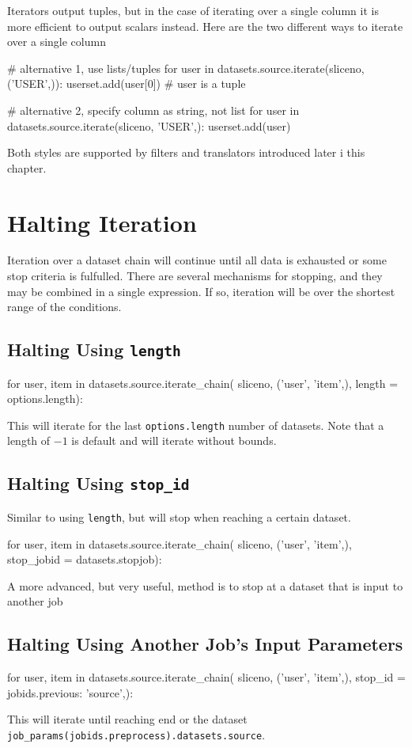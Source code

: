 Iterators output tuples, but in the case of iterating over a single
column it is more efficient to output scalars instead.  Here are the
two different ways to iterate over a single column
\begin{python}
# alternative 1, use lists/tuples
for user in datasets.source.iterate(sliceno, ('USER',)):
    userset.add(user[0])  # user is a tuple

# alternative 2, specify column as string, not list
for user in datasets.source.iterate(sliceno, 'USER',):
    userset.add(user)
\end{python}
Both styles are supported by filters and translators introduced later
i this chapter.




\section{Halting Iteration}

Iteration over a dataset chain will continue until all data is
exhausted or some stop criteria is fulfulled.  There are several
mechanisms for stopping, and they may be combined in a single
expression.  If so, iteration will be over the shortest range of the
conditions.

\subsection*{Halting Using \texttt{length}}
\begin{python}
for user, item in datasets.source.iterate_chain(
    sliceno, ('user', 'item',),
    length = options.length):
\end{python}
This will iterate for the last \texttt{options.length} number of
datasets.  Note that a length of $-1$ is default and will iterate
without bounds.


\subsection*{Halting Using \texttt{stop\_id}}
Similar to using \texttt{length}, but will stop when reaching a
certain dataset.
\begin{python}
for user, item in datasets.source.iterate_chain(
    sliceno, ('user', 'item',),
    stop_jobid = datasets.stopjob):
\end{python}

A more advanced, but very useful, method is to stop at a dataset that
is input to another job
\subsection*{Halting Using Another Job's Input Parameters}
\begin{python}
for user, item in datasets.source.iterate_chain(
    sliceno, ('user', 'item',),
    stop_id = {jobids.previous: 'source',}):
\end{python}
This will iterate until reaching end or the dataset
\texttt{job\_params(jobids.preprocess).datasets.source}.



